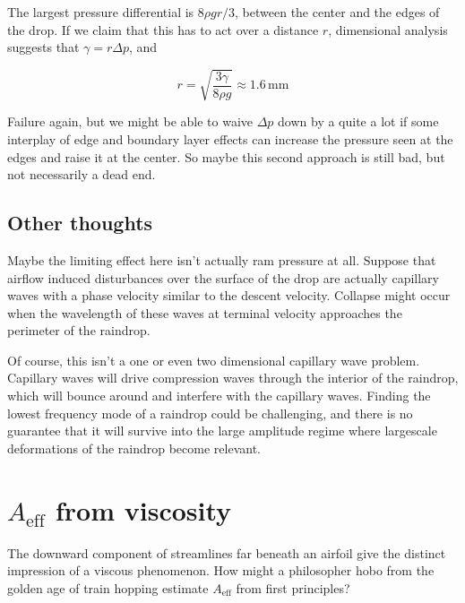\documentclass[12pt]{article}
\begin{document}
The largest pressure differential is \(8\rho gr/3\), between the center and the edges of the drop. If we claim that this has to act over a distance \(r\), dimensional analysis suggests that \(\gamma = r\Delta p \), and

\[ r = \sqrt{\frac{3\gamma}{8\rho g}} \approx 1.6\,\mathrm{mm}
\]

Failure again, but we might be able to waive \(\Delta p\) down by a quite a lot if some interplay of edge and boundary layer effects can increase the pressure seen at the edges and raise it at the center. So maybe this second approach is still bad, but not necessarily a dead end.

\subsection{Other thoughts}

Maybe the limiting effect here isn't actually ram pressure at all. Suppose that airflow induced disturbances over the surface of the drop are actually capillary waves with a phase velocity similar to the descent velocity. Collapse might occur when the wavelength of these waves at terminal velocity approaches the perimeter of the raindrop.

Of course, this isn't a one or even two dimensional capillary wave problem. Capillary waves will drive compression waves through the interior of the raindrop, which will bounce around and interfere with the capillary waves. Finding the lowest frequency mode of a raindrop could be challenging, and there is no guarantee that it will survive into the large amplitude regime where largescale deformations of the raindrop become relevant. 

\section{\(A_{\mathrm{eff}}\) from viscosity}

The downward component of streamlines far beneath an airfoil give the distinct impression of a viscous phenomenon. How might a philosopher hobo from the golden age of train hopping estimate \(A_{\mathrm{eff}}\) from first principles?
\end{document}
